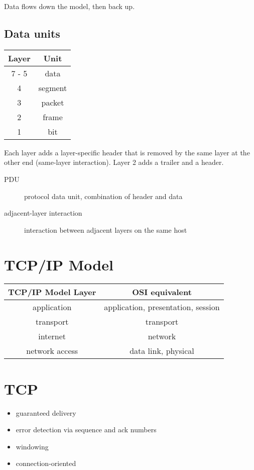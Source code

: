 \documentclass{article}
\begin{document}
Data flows down the model, then back up.

\subsection{Data units}

\begin{tabular}{ | c | c | }
\hline
Layer & Unit \\ \hline \hline
7 - 5 & data \\ \hline
4 & segment \\ \hline
3 & packet \\ \hline
2 & frame \\ \hline
1 & bit \\ \hline
\end{tabular}

Each layer adds a layer-specific header that is removed by the same layer at
the other end (same-layer interaction). Layer 2 adds a trailer and a header.

\begin{description}

\item[PDU]
protocol data unit, combination of header and data

\item[adjacent-layer interaction]
interaction between adjacent layers on the same host

\end{description}

\section{TCP/IP Model}

\begin{tabular}{ | c | c | }
\hline
TCP/IP Model Layer & OSI equivalent \\ \hline \hline
application & application, presentation, session \\ \hline
transport & transport \\ \hline
internet & network \\ \hline
network access & data link, physical\\ \hline
\end{tabular}

\section{TCP}

\begin{itemize}

\item guaranteed delivery
\item error detection via sequence and ack numbers
\item windowing
\item connection-oriented

\end{itemize}
\end{document}
